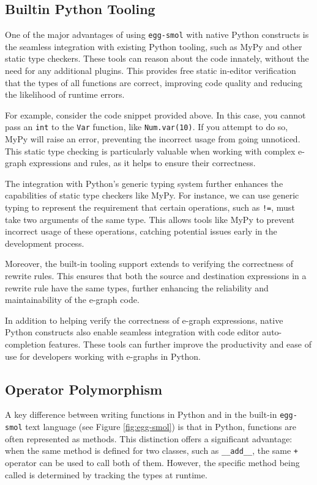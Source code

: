 \documentclass[sigplan,screen,review]{acmart}
\begin{document}
\subsection{Builtin Python Tooling}

One of the major advantages of using \verb|egg-smol| with native Python constructs is the seamless integration with existing Python tooling, such as MyPy and other static type checkers. These tools can reason about the code innately, without the need for any additional plugins. This provides free static in-editor verification that the types of all functions are correct, improving code quality and reducing the likelihood of runtime errors.

For example, consider the code snippet provided above. In this case, you cannot pass an \verb|int| to the \verb|Var| function, like \verb|Num.var(10)|. If you attempt to do so, MyPy will raise an error, preventing the incorrect usage from going unnoticed. This static type checking is particularly valuable when working with complex e-graph expressions and rules, as it helps to ensure their correctness.

The integration with Python's generic typing system further enhances the capabilities of static type checkers like MyPy. For instance, we can use generic typing to represent the requirement that certain operations, such as \verb|!=|, must take two arguments of the same type. This allows tools like MyPy to prevent incorrect usage of these operations, catching potential issues early in the development process.

Moreover, the built-in tooling support extends to verifying the correctness of rewrite rules. This ensures that both the source and destination expressions in a rewrite rule have the same types, further enhancing the reliability and maintainability of the e-graph code.

In addition to helping verify the correctness of e-graph expressions, native Python constructs also enable seamless integration with code editor auto-completion features. These tools can further improve the productivity and ease of use for developers working with e-graphs in Python.

\subsection{Operator Polymorphism}

A key difference between writing functions in Python and in the built-in \verb|egg-smol| text language (see Figure \ref{fig:egg-smol}) is that in Python, functions are often represented as methods. This distinction offers a significant advantage: when the same method is defined for two classes, such as \verb|__add__|, the same \verb|+| operator can be used to call both of them. However, the specific method being called is determined by tracking the types at runtime.
\end{document}
